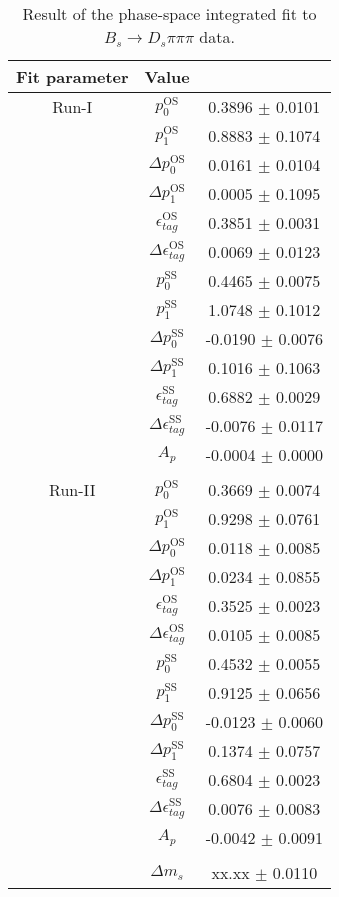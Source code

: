 \begin{table}[h]
\centering
\caption{Result of the phase-space integrated fit to $B_s \to D_s \pi \pi \pi$ data.}
\begin{tabular}{c c c}
\hline
\hline
Fit parameter & Value \\
\hline
Run-I & $p_{0}^{\text{OS}}$ & 0.3896 $\pm$ 0.0101\\
&$p_{1}^{\text{OS}}$  & 0.8883 $\pm$ 0.1074\\
&$\Delta p_{0}^{\text{OS}}$  & 0.0161 $\pm$ 0.0104\\
&$\Delta p_{1}^{\text{OS}}$  & 0.0005 $\pm$ 0.1095\\
&$\epsilon_{tag}^{\text{OS}}$  & 0.3851 $\pm$ 0.0031\\
&$\Delta\epsilon_{tag}^{\text{OS}}$  & 0.0069 $\pm$ 0.0123\\
& $p_{0}^{\text{SS}}$ & 0.4465 $\pm$ 0.0075\\
&$p_{1}^{\text{SS}}$  & 1.0748 $\pm$ 0.1012\\
&$\Delta p_{0}^{\text{SS}}$  & -0.0190 $\pm$ 0.0076\\
&$\Delta p_{1}^{\text{SS}}$  & 0.1016 $\pm$ 0.1063\\
&$\epsilon_{tag}^{\text{SS}}$  & 0.6882 $\pm$ 0.0029\\
&$\Delta\epsilon_{tag}^{\text{SS}}$  & -0.0076 $\pm$ 0.0117\\
&$A_{p}$ & -0.0004 $\pm$ 0.0000\\
\\
Run-II & $p_{0}^{\text{OS}}$  & 0.3669 $\pm$ 0.0074\\
&$p_{1}^{\text{OS}}$  & 0.9298 $\pm$ 0.0761\\
&$\Delta p_{0}^{\text{OS}}$  & 0.0118 $\pm$ 0.0085\\
&$\Delta p_{1}^{\text{OS}}$  & 0.0234 $\pm$ 0.0855\\
&$\epsilon_{tag}^{\text{OS}}$  & 0.3525 $\pm$ 0.0023\\
&$\Delta\epsilon_{tag}^{\text{OS}}$  & 0.0105 $\pm$ 0.0085\\
& $p_{0}^{\text{SS}}$  & 0.4532 $\pm$ 0.0055\\
&$p_{1}^{\text{SS}}$  & 0.9125 $\pm$ 0.0656\\
&$\Delta p_{0}^{\text{SS}}$  & -0.0123 $\pm$ 0.0060\\
&$\Delta p_{1}^{\text{SS}}$  & 0.1374 $\pm$ 0.0757\\
&$\epsilon_{tag}^{\text{SS}}$  & 0.6804 $\pm$ 0.0023\\
&$\Delta\epsilon_{tag}^{\text{SS}}$  & 0.0076 $\pm$ 0.0083\\
&$A_{p}$ & -0.0042 $\pm$ 0.0091\\
\\
&$\Delta m_{s}$ &  xx.xx  $\pm$ 0.0110\\
\hline
\hline
\end{tabular}
\label{table:timeFit_norm}
\end{table}